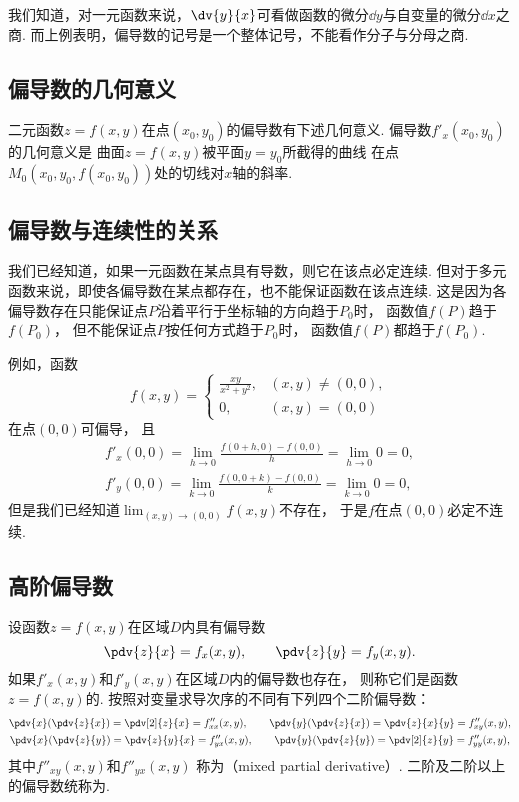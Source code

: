 我们知道，对一元函数来说，\(\dv{y}{x}\)可看做函数的微分\(\dd{y}\)与自变量的微分\(\dd{x}\)之商.
而上例表明，偏导数的记号是一个整体记号，不能看作分子与分母之商.

\subsection{偏导数的几何意义}
二元函数\(z=f(x,y)\)在点\((x_0,y_0)\)的偏导数有下述几何意义.
偏导数\(f'_x(x_0,y_0)\)的几何意义是
曲面\(z=f(x,y)\)被平面\(y=y_0\)所截得的曲线
在点\(M_0(x_0,y_0,f(x_0,y_0))\)处的切线对\(x\)轴的斜率.

\subsection{偏导数与连续性的关系}
我们已经知道，如果一元函数在某点具有导数，则它在该点必定连续.
但对于多元函数来说，即使各偏导数在某点都存在，也不能保证函数在该点连续.
这是因为各偏导数存在只能保证点\(P\)沿着平行于坐标轴的方向趋于\(P_0\)时，
函数值\(f(P)\)趋于\(f(P_0)\)，
但不能保证点\(P\)按任何方式趋于\(P_0\)时，
函数值\(f(P)\)都趋于\(f(P_0)\).

例如，函数\[
	f(x,y) = \left\{ \begin{array}{cl}
		\frac{xy}{x^2+y^2}, & (x,y)\neq(0,0), \\
		0, & (x,y)=(0,0)
	\end{array} \right.
\]
在点\((0,0)\)可偏导，
且\begin{gather*}
	f'_x(0,0) = \lim_{h\to0} \frac{f(0+h,0) - f(0,0)}{h} = \lim_{h\to0} 0 = 0, \\
	f'_y(0,0) = \lim_{k\to0} \frac{f(0,0+k) - f(0,0)}{k} = \lim_{k\to0} 0 = 0,
\end{gather*}
但是我们已经知道\(\lim_{(x,y)\to(0,0)} f(x,y)\)不存在，
于是\(f\)在点\((0,0)\)必定不连续.

\subsection{高阶偏导数}
\begin{definition}
设函数\(z=f(x,y)\)在区域\(D\)内具有偏导数\[
	\pdv{z}{x} = f_x(x,y), \qquad
	\pdv{z}{y} = f_y(x,y).
\]
如果\(f'_x(x,y)\)和\(f'_y(x,y)\)在区域\(D\)内的偏导数也存在，
则称它们是函数\(z=f(x,y)\)的.
按照对变量求导次序的不同有下列四个二阶偏导数：
\begin{gather*}
	\pdv{x}(\pdv{z}{x}) = \pdv[2]{z}{x} = f''_{xx}(x,y),
	\qquad
	\pdv{y}(\pdv{z}{x}) = \pdv{z}{x}{y} = f''_{xy}(x,y), \\
	\pdv{x}(\pdv{z}{y}) = \pdv{z}{y}{x} = f''_{yx}(x,y),
	\qquad
	\pdv{y}(\pdv{z}{y}) = \pdv[2]{z}{y} = f''_{yy}(x,y),
\end{gather*}
其中\(f''_{xy}(x,y)\)和\(f''_{yx}(x,y)\)
称为（mixed partial derivative）.
二阶及二阶以上的偏导数统称为.
\end{definition}

